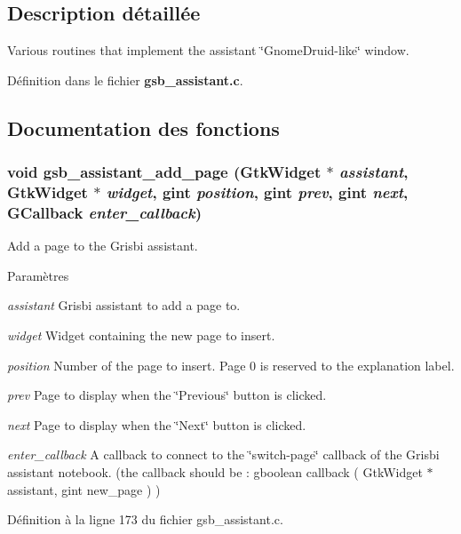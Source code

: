 \subsection{Description détaillée}
Various routines that implement the assistant \char`\"{}GnomeDruid-\/like\char`\"{} window. 

Définition dans le fichier {\bf gsb\_\-assistant.c}.



\subsection{Documentation des fonctions}
\subsubsection[{gsb\_\-assistant\_\-add\_\-page}]{\setlength{\rightskip}{0pt plus 5cm}void gsb\_\-assistant\_\-add\_\-page (GtkWidget $\ast$ {\em assistant}, \/  GtkWidget $\ast$ {\em widget}, \/  gint {\em position}, \/  gint {\em prev}, \/  gint {\em next}, \/  GCallback {\em enter\_\-callback})}\label{gsb__assistant_8c_a6972bde2415e07b7afb35a062456f129}
Add a page to the Grisbi assistant.


\begin{DoxyParams}{Paramètres}
\item[{\em assistant}]Grisbi assistant to add a page to. \item[{\em widget}]Widget containing the new page to insert. \item[{\em position}]Number of the page to insert. Page 0 is reserved to the explanation label. \item[{\em prev}]Page to display when the \char`\"{}Previous\char`\"{} button is clicked. \item[{\em next}]Page to display when the \char`\"{}Next\char`\"{} button is clicked. \item[{\em enter\_\-callback}]A callback to connect to the \char`\"{}switch-\/page\char`\"{} callback of the Grisbi assistant notebook. (the callback should be : gboolean callback ( GtkWidget $\ast$assistant, gint new\_\-page ) ) \end{DoxyParams}


Définition à la ligne 173 du fichier gsb\_\-assistant.c.

